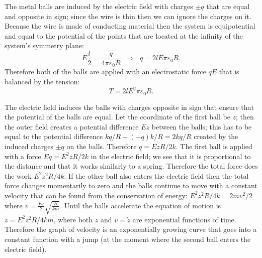 \documentclass[11pt]{article}
\begin{document}

\solueng
The metal balls are induced by the electric field with charges $\pm q$ that are equal and opposite in sign; since the wire is thin then we can ignore the charges on it. Because the wire is made of conducting material then the system is equipotential and equal to the potential of the points that are located at the infinity of the system’s symmetry plane:
$$E\frac l2=\frac q{4\pi\varepsilon_0R}\;\;\Rightarrow\;\; q=2lE\pi\varepsilon_0R.$$ 
Therefore both of the balls are applied with an electrostatic force $qE$ that is balanced by the tension:
$$T=2lE^2\pi\varepsilon_0R.$$
\probend
\bigskip


\solueng
The electric field induces the balls with charges opposite in sign that ensure that the potential of the balls are equal. Let the coordinate of the first ball be $z$; then the outer field creates a potential difference $Ez$ between the balls; this has to be equal to the potential difference $kq/R-(-q)k/R=2kq/R$ created by the induced charges $\pm q$ on the balls. Therefore $q=EzR/2k$. The first ball is applied with a force $Eq=E^2zR/2k$ in the electric field; we see that it is proportional to the distance and that it works similarly to a spring. Therefore the total force does the work $E^2z^2R/4k$. If the other ball also enters the electric field then the total force changes momentarily to zero and the balls continue to move with a constant velocity that can be found from the conservation of energy: $E^2z^2R/4k=2mv^2/2$ where $v=\frac {Ez}{2}\sqrt{\frac{R}{km}}$. Until the balls accelerate the equation of motion is $\ddot z=E^2z^2R/4km$, where both $z$ and $v=\dot z$ are exponential functions of time. Therefore the graph of velocity is an exponentially growing curve that goes into a constant function with a jump (at the moment where the second ball enters the electric field).
\probend
\bigskip

\end{document}
